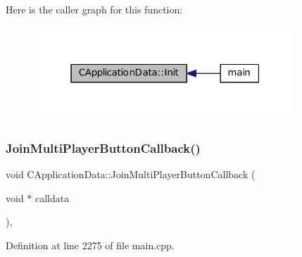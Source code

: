 Here is the caller graph for this function\+:\nopagebreak
\begin{figure}[H]
\begin{center}
\leavevmode
\includegraphics[width=280pt]{classCApplicationData_ab757e7ad037decb18cefa3f4ad2e1298_icgraph}
\end{center}
\end{figure}
\hypertarget{classCApplicationData_a4fa8cf7a67c0ae980d38e1fe7b967f41}{}\label{classCApplicationData_a4fa8cf7a67c0ae980d38e1fe7b967f41} 
\subsubsection{\texorpdfstring{Join\+Multi\+Player\+Button\+Callback()}{JoinMultiPlayerButtonCallback()}}
{\footnotesize\ttfamily void C\+Application\+Data\+::\+Join\+Multi\+Player\+Button\+Callback (\begin{DoxyParamCaption}\item[{void $\ast$}]{calldata }\end{DoxyParamCaption})\hspace{0.3cm}{\ttfamily [static]}, {\ttfamily [protected]}}



Definition at line 2275 of file main.\+cpp.



